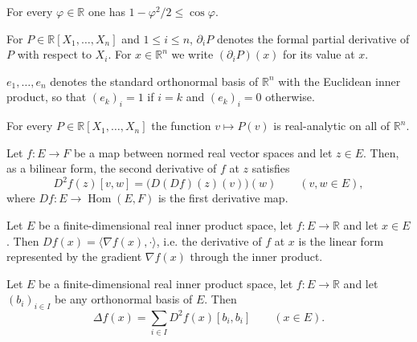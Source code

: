 \begin{proposition}
For every $\varphi\in\mathbb{R}$ one has $1-\varphi^2/2\le\cos\varphi$.
\end{proposition}

\begin{definition}
For $P\in\mathbb{R}[X_1,\dots,X_n]$ and $1\le i\le n$, $\partial_iP$ denotes the
formal partial derivative of $P$ with respect to $X_i$. For $x\in\mathbb{R}^n$
we write $(\partial_iP)(x)$ for its value at $x$.
\end{definition}

\begin{definition}
$e_1,\dots,e_n$ denotes the standard orthonormal basis of $\mathbb{R}^n$ with
the Euclidean inner product, so that $(e_k)_i=1$ if $i=k$ and $(e_k)_i=0$
otherwise.
\end{definition}

\begin{proposition}
For every $P\in\mathbb{R}[X_1,\dots,X_n]$ the function
$v\mapsto P(v)$ is real-analytic on all of $\mathbb{R}^n$.
\end{proposition}

\begin{proposition}
Let $f:E\to F$ be a map between normed real vector spaces and let $z\in E$.
Then, as a bilinear form, the second derivative of $f$ at $z$ satisfies
\[
  D^2f(z)[v,w]=\bigl(D(Df)(z)(v)\bigr)(w)
  \qquad(v,w\in E),
\]
where $Df:E\to\operatorname{Hom}(E,F)$ is the first derivative map.
\end{proposition}

\begin{proposition}
Let $E$ be a finite-dimensional real inner product space, let $f:E\to\mathbb{R}$
and let $x\in E$. Then $Df(x)=\langle\nabla f(x),\cdot\rangle$, i.e. the
derivative of $f$ at $x$ is the linear form represented by the gradient
$\nabla f(x)$ through the inner product.
\end{proposition}

\begin{proposition}
Let $E$ be a finite-dimensional real inner product space, let $f:E\to\mathbb{R}$
and let $(b_i)_{i\in I}$ be any orthonormal basis of $E$. Then
\[
  \Delta f(x)=\sum_{i\in I}D^2f(x)[b_i,b_i]
  \qquad(x\in E).
\]
\end{proposition}

